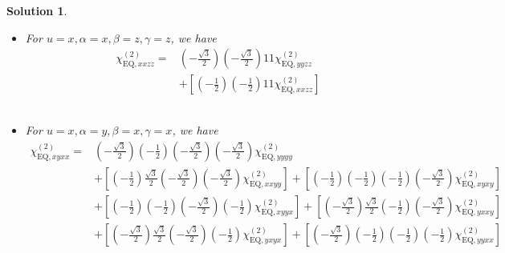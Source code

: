 \documentclass[UTF8,10pt,a4paper]{article}
\theoremstyle{Problem}
\theoremstyle{Solution}
\newtheorem*{sol}{Solution}
\begin{document}
\begin{sol}
\begin{itemize}
\begin{align}
\nonumber&+\left[\left(-\frac{1}{2}\right)\left(-\frac{1}{2}\right)1\left(-\frac{1}{2}\right)\chi_{\text{EQ},xxzy}^{(2)}\right]\\
\nonumber&+\left[\left(-\frac{1}{2}\right)\left(-\frac{\sqrt{3}}{2}\right)1\frac{\sqrt{3}}{2}\chi_{\text{EQ},xyzx}^{(2)}\right]\\
\nonumber&+\left[\left(-\frac{\sqrt{3}}{2}\right)\left(-\frac{1}{2}\right)1\frac{\sqrt{3}}{2}\chi_{\text{EQ},yxzx}^{(2)}\right]\\
&
\end{align}\normalsize
\item For $u=x,\alpha=x,\beta=z,\gamma=z$, we have
\footnotesize\begin{align}
\nonumber\chi_{\text{EQ},xxzz}^{(2)}=&\left(-\frac{\sqrt{3}}{2}\right)\left(-\frac{\sqrt{3}}{2}\right)11\chi_{\text{EQ},yyzz}^{(2)}\\
\nonumber&+\left[\left(-\frac{1}{2}\right)\left(-\frac{1}{2}\right)11\chi_{\text{EQ},xxzz}^{(2)}\right]\\
\nonumber&\\
\nonumber&\\
&
\end{align}\normalsize
\item For $u=x,\alpha=y,\beta=x,\gamma=x$, we have
\footnotesize\begin{align}
\nonumber\chi_{\text{EQ},xyxx}^{(2)}=&\left(-\frac{\sqrt{3}}{2}\right)\left(-\frac{1}{2}\right)\left(-\frac{\sqrt{3}}{2}\right)\left(-\frac{\sqrt{3}}{2}\right)\chi_{\text{EQ},yyyy}^{(2)}\\
\nonumber&+\left[\left(-\frac{1}{2}\right)\frac{\sqrt{3}}{2}\left(-\frac{\sqrt{3}}{2}\right)\left(-\frac{\sqrt{3}}{2}\right)\chi_{\text{EQ},xxyy}^{(2)}\right]+\left[\left(-\frac{1}{2}\right)\left(-\frac{1}{2}\right)\left(-\frac{1}{2}\right)\left(-\frac{\sqrt{3}}{2}\right)\chi_{\text{EQ},xyxy}^{(2)}\right]\\
\nonumber&+\left[\left(-\frac{1}{2}\right)\left(-\frac{1}{2}\right)\left(-\frac{\sqrt{3}}{2}\right)\left(-\frac{1}{2}\right)\chi_{\text{EQ},xyyx}^{(2)}\right]+\left[\left(-\frac{\sqrt{3}}{2}\right)\frac{\sqrt{3}}{2}\left(-\frac{1}{2}\right)\left(-\frac{\sqrt{3}}{2}\right)\chi_{\text{EQ},yxxy}^{(2)}\right]\\
\nonumber&+\left[\left(-\frac{\sqrt{3}}{2}\right)\frac{\sqrt{3}}{2}\left(-\frac{\sqrt{3}}{2}\right)\left(-\frac{1}{2}\right)\chi_{\text{EQ},yxyx}^{(2)}\right]+\left[\left(-\frac{\sqrt{3}}{2}\right)\left(-\frac{1}{2}\right)\left(-\frac{1}{2}\right)\left(-\frac{1}{2}\right)\chi_{\text{EQ},yyxx}^{(2)}\right]\\

\end{align}
\end{itemize}
\end{sol}
\end{document}
